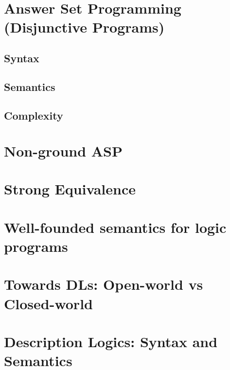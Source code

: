 \documentclass[12pt]{extarticle}
\begin{document}


\section{Answer Set Programming (Disjunctive Programs)}

\subsection{Syntax}

\subsection{Semantics}

\subsection{Complexity}



\section{Non-ground ASP}

\section{Strong Equivalence}

\section{Well-founded semantics for logic programs}


\section{Towards DLs: Open-world vs Closed-world}

\section{Description Logics: Syntax and Semantics}
\end{document}
